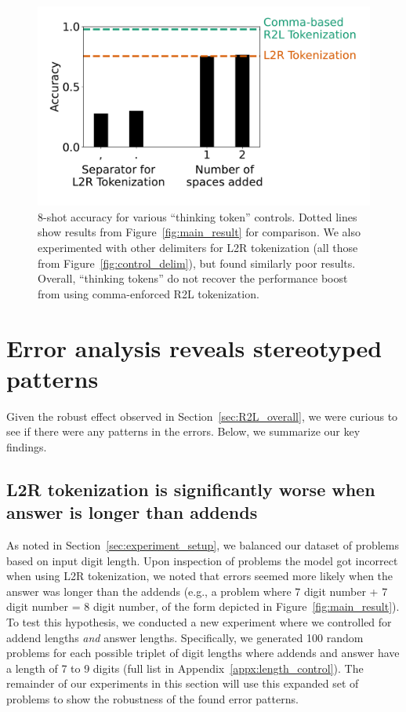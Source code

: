 \documentclass{article}
\theoremstyle{plain}
\theoremstyle{definition}
\theoremstyle{remark}
\begin{document}
\begin{figure}
    \centering
    \vspace{-0.8em}
    \includegraphics[width=\columnwidth]{figures/control_thinking_token.pdf}
    \vspace{-3em}
    \caption{8-shot accuracy for various ``thinking token'' controls. Dotted lines show results from Figure~\ref{fig:main_result} for comparison. We also experimented with other delimiters for L2R tokenization (all those from Figure~\ref{fig:control_delim}), but found similarly poor results. Overall, ``thinking tokens'' do not recover the performance boost from using comma-enforced R2L tokenization.}
    \vspace{-1em}
    \label{fig:control_thinking_token}
\end{figure}

\section{Error analysis reveals stereotyped patterns}
\label{sec:error_patterns_overall}

Given the robust effect observed in Section~\ref{sec:R2L_overall}, we were curious to see if there were any patterns in the errors. Below, we summarize our key findings.

\subsection{L2R tokenization is significantly worse when answer is longer than addends}
\label{sec:error_length}

As noted in Section~\ref{sec:experiment_setup}, we balanced our dataset of problems based on input digit length. Upon inspection of problems the model got incorrect when using L2R tokenization, we noted that errors seemed more likely when the answer was longer than the addends (e.g., a problem where 7 digit number + 7 digit number = 8 digit number, of the form depicted in Figure~\ref{fig:main_result}). To test this hypothesis, we conducted a new experiment where we controlled for addend lengths \textit{and} answer lengths. Specifically, we generated 100 random problems for each possible triplet of digit lengths where addends and answer have a length of 7 to 9 digits (full list in Appendix~\ref{appx:length_control}). The remainder of our experiments in this section will use this expanded set of problems to show the robustness of the found error patterns.
\end{document}
